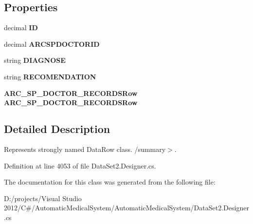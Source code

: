 \subsection*{Properties}
\begin{CompactItemize}
\item 
decimal \textbf{ID}\hspace{0.3cm}{\tt  [get, set]}\label{class_automatic_medical_system_1_1_data_set2_1_1_d_i_a_g_n_o_s_e___s_p___d_o_c_t_o_r_row_235e41e11c42606d44c167f75aba17d4}

\item 
decimal \textbf{ARCSPDOCTORID}\hspace{0.3cm}{\tt  [get, set]}\label{class_automatic_medical_system_1_1_data_set2_1_1_d_i_a_g_n_o_s_e___s_p___d_o_c_t_o_r_row_0c77e52e6fe6465d2822e1359c5e46a5}

\item 
string \textbf{DIAGNOSE}\hspace{0.3cm}{\tt  [get, set]}\label{class_automatic_medical_system_1_1_data_set2_1_1_d_i_a_g_n_o_s_e___s_p___d_o_c_t_o_r_row_45559a2a7c23d2dc08b29496ff798c66}

\item 
string \textbf{RECOMENDATION}\hspace{0.3cm}{\tt  [get, set]}\label{class_automatic_medical_system_1_1_data_set2_1_1_d_i_a_g_n_o_s_e___s_p___d_o_c_t_o_r_row_8138467b09f769458bae799ee06bfed6}

\item 
{\bf ARC\_\-SP\_\-DOCTOR\_\-RECORDSRow} \textbf{ARC\_\-SP\_\-DOCTOR\_\-RECORDSRow}\hspace{0.3cm}{\tt  [get, set]}\label{class_automatic_medical_system_1_1_data_set2_1_1_d_i_a_g_n_o_s_e___s_p___d_o_c_t_o_r_row_af8b00a0b6ce904be13006bbce093245}

\end{CompactItemize}


\subsection{Detailed Description}
Represents strongly named DataRow class. /summary$>$. 

Definition at line 4053 of file DataSet2.Designer.cs.

The documentation for this class was generated from the following file:\begin{CompactItemize}
\item 
D:/projects/Visual Studio 2012/C\#/AutomaticMedicalSystem/AutomaticMedicalSystem/DataSet2.Designer.cs\end{CompactItemize}

